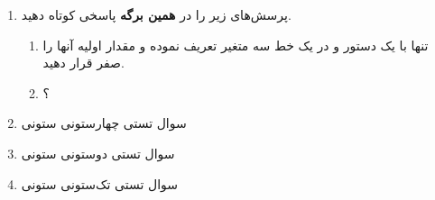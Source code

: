 \documentclass[a4paper,12pt]{unistyle}
\begin{document}
\MakeTitle
\begin{enumerate}

    \item
    پرسش‌های زیر را در \textbf{همین برگه} پاسخی کوتاه دهید. 
    \begin{enumerate}[itemtwocol]
        \parskip=20pt
        \item تنها با یک دستور و  در یک خط سه متغیر تعریف نموده و مقدار اولیه آنها را صفر قرار دهید.
        \item {}؟
    \end{enumerate}


    \item سوال تستی چهارستونی ستونی       
    \item سوال تستی دوستونی ستونی
    \item سوال تستی تک‌ستونی ستونی

\end{enumerate}


\sign
\kalamehakim
\vfill\xepersianproof
\end{document}
